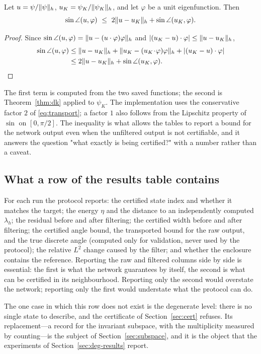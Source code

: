 \begin{lemma}[Transport]\label{lem:transport}
Let $u=\psi/\lVert \psi\rVert_h$, $u_K=\psi_K/\lVert \psi_K\rVert_h$, and let $\varphi$ be
a unit eigenfunction. Then
\begin{equation}
  \sin\angle(u,\varphi)\ \le\ 2\norm{u-u_K}_h+\sin\angle(u_K,\varphi).
  \label{eq:transport}
\end{equation}
\end{lemma}
\begin{proof}
Since $\sin\angle(u,\varphi)=\lVert u-(u\cdot\varphi)\varphi\rVert_h$ and
$\lvert (u_K-u)\cdot\varphi\rvert\le\lVert u-u_K\rVert_h$,
\begin{align*}
\sin\angle(u,\varphi)
&\le \lVert u-u_K\rVert_h+\lVert u_K-(u_K\!\cdot\!\varphi)\varphi\rVert_h
   +\lvert (u_K-u)\cdot\varphi\rvert\\
&\le 2\lVert u-u_K\rVert_h+\sin\angle(u_K,\varphi). \qedhere
\end{align*}
\end{proof}

The first term is computed from the two saved functions; the second is
Theorem~\ref{thm:dk} applied to $\psi_K$. The implementation uses the
conservative factor $2$ of \eqref{eq:transport}; a factor $1$ also follows from
the Lipschitz property of $\sin$ on $[0,\pi/2]$. The inequality is what allows
the tables to report a bound for the network output even when the unfiltered
output is not certifiable, and it answers the question "what exactly is being
certified?" with a number rather than a caveat.

\subsection{What a row of the results table contains}
\label{sec:row}

For each run the protocol reports: the certified state index and whether it
matches the target; the energy $\eta$ and the distance to an independently
computed $\lambda_h$; the residual before and after filtering; the certified
width before and after filtering; the certified angle bound, the transported
bound for the raw output, and the true discrete angle (computed only for
validation, never used by the protocol); the relative $L^2$ change caused by
the filter; and whether the enclosure contains the reference. Reporting the
raw and filtered columns side by side is essential: the first is what the
network guarantees by itself, the second is what can be certified in its
neighbourhood. Reporting only the second would overstate the network;
reporting only the first would understate what the protocol can do.

The one case in which this row does not exist is the degenerate level: there
is no single state to describe, and the certificate of
Section~\ref{sec:cert} refuses. Its replacement---a record for the invariant
subspace, with the multiplicity measured by counting---is the subject of
Section~\ref{sec:subspace}, and it is the object that the experiments of
Section~\ref{sec:deg-results} report.
